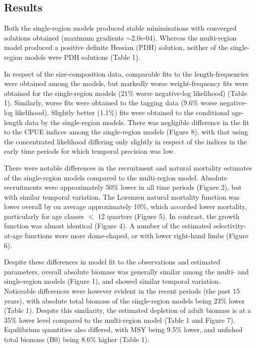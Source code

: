 \documentclass{SCreport}
\begin{document}
\subsection*{Results}

Both the single-region models produced stable minimisations with converged
solutions obtained (maximum gradients $\sim$2.0e-04). Whereas the
multi-region model produced a positive definite Hessian (PDH) solution, neither
of the single-region models were PDH solutions (Table 1).

In respect of the size-composition data, comparable fits to the
length-frequencies were obtained among the models, but markedly worse
weight-frequency fits were obtained for the single-region models (21\% worse
negative-log likelihood) (Table 1). Similarly, worse fits were obtained to the
tagging data (9.6\% worse negative-log likelihood). Slightly better (1.1\%) fits
were obtained to the conditional age-length data by the single-region models.
There was negligible difference in the fit to the CPUE indices among the
single-region models (Figure 8), with that using the concentrated likelihood
differing only slightly in respect of the indices in the early time periods for
which temporal precision was low.

There were notable differences in the recruitment and natural mortality
estimates of the single-region models compared to the multi-region model.
Absolute recruitments were approximately 50\% lower in all time periods (Figure
2), but with similar temporal variation. The Lorenzen natural mortality function
was lower overall by on average approximately 10\%, which accorded lower
mortality, particularly for age classes $<$ 12 quarters (Figure 5). In contrast,
the growth function was almost identical (Figure 4). A number of the estimated
selectivity-at-age functions were more dome-shaped, or with lower right-hand
limbs (Figure 6).

Despite these differences in model fit to the observations and estimated
parameters, overall absolute biomass was generally similar among the multi- and
single-region models (Figure 1), and showed similar temporal variation.
Noticeable differences were however evident in the recent periods (the past 15
years), with absolute total biomass of the single-region models being 23\% lower
(Table 1). Despite this similarity, the estimated depletion of adult biomass is
at a 35\% lower level compared to the multi-region model (Table 1 and Figure 7).
Equilibrium quantities also differed, with MSY being 9.5\% lower, and unfished
total biomass (B0) being 8.6\% higher (Table 1).
\end{document}
